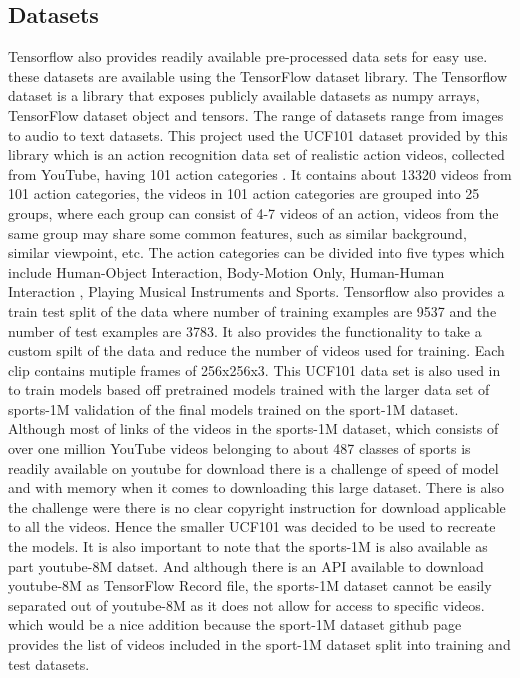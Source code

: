 \subsection{Datasets}
Tensorflow also provides readily available pre-processed data sets for easy use. these datasets are available using the TensorFlow dataset library. The Tensorflow dataset is a library that exposes publicly available datasets as numpy arrays, TensorFlow dataset object and tensors. The range of datasets range from images to audio to text datasets.
This project used the UCF101 dataset provided by this library which is an action recognition data set of realistic action videos, collected from YouTube, having 101 action categories \cite{soomro2012ucf101}. It contains about 13320 videos from 101 action categories, the videos in 101 action categories are grouped into 25 groups, where each group can consist of 4-7 videos of an action, videos from the same group may share some common features, such as similar background, similar viewpoint, etc.
The action categories can be divided into five types which include Human-Object Interaction, Body-Motion Only, Human-Human Interaction , Playing Musical Instruments and Sports.
Tensorflow also provides a train test split of the data where number of training examples are 9537 and the number of test examples are 3783.
It also provides the functionality to take a custom spilt of the data and reduce the number of videos used for training. Each clip contains mutiple frames of 256x256x3.
This UCF101 data set is also used in \citep{KarpathyCVPR14} to train models based off pretrained models trained with the larger data set of sports-1M validation of the final models trained on the sport-1M dataset.
Although most of links of the videos in the sports-1M dataset, which consists of over one million YouTube videos belonging to about 487 classes of sports is readily available on youtube for download there is a challenge of speed of model and with memory when it comes to downloading this large dataset. There is also the challenge were there is no clear copyright instruction for download applicable to all the videos. Hence the smaller UCF101 was decided to be used to recreate the models. It is also important to note that the sports-1M is also available as part youtube-8M datset. And although there is an API available to download youtube-8M as TensorFlow Record file, the sports-1M dataset cannot be easily separated out of youtube-8M as it does not allow for access to specific videos. which would be a nice addition because the sport-1M dataset github page provides the list of videos included in the sport-1M dataset split into training and test datasets.

